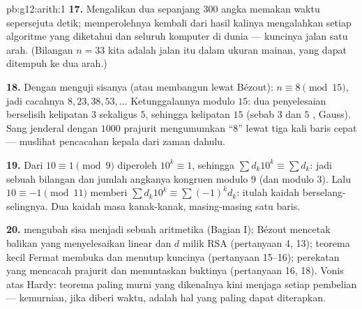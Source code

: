 \begin{solution}{pb:g12:arith:1}
\textbf{17.} Mengalikan dua  sepanjang $300$ angka memakan waktu
sepersejuta detik; memperolehnya kembali dari hasil kalinya mengalahkan setiap
algoritme yang diketahui dan seluruh komputer di dunia --- kuncinya
jalan satu arah. (Bilangan $n = 33$ kita adalah jalan itu dalam ukuran mainan,
yang dapat ditempuh ke dua arah.)

\textbf{18.} Dengan menguji sisanya (atau membangun lewat Bézout):
$n \equiv 8 \pmod{15}$, jadi cacahnya $8, 23, 38, 53, \dots$
Ketunggalannya modulo $15$: dua penyelesaian berselisih kelipatan
$3$ sekaligus $5$, sehingga kelipatan $15$ (sebab $3$ dan $5$ , Gauss).
Sang jenderal dengan $1000$ prajurit mengumumkan ``$8$'' lewat tiga
kali baris cepat --- muslihat pencacahan kepala dari zaman dahulu.

\textbf{19.} Dari $10 \equiv 1 \pmod 9$ diperoleh $10^k \equiv 1$, sehingga
$\sum d_k 10^k \equiv \sum d_k$: jadi sebuah bilangan dan jumlah angkanya
kongruen modulo $9$ (dan modulo $3$). Lalu
$10 \equiv -1 \pmod{11}$ memberi
$\sum d_k 10^k \equiv \sum (-1)^k d_k$: itulah kaidah berselang-selingnya.
Dua kaidah masa kanak-kanak, masing-masing satu baris.

\textbf{20.}  mengubah sisa menjadi sebuah aritmetika
(Bagian I); Bézout mencetak balikan yang menyelesaikan 
linear dan $d$ milik RSA (pertanyaan 4, 13); teorema kecil
Fermat membuka dan menutup kuncinya (pertanyaan 15--16); perekatan
 yang  mencacah prajurit dan menuntaskan buktinya
(pertanyaan 16, 18). Vonis atas Hardy: teorema paling murni yang
dikenalnya kini menjaga setiap pembelian --- kemurnian, jika diberi waktu,
adalah hal yang paling dapat diterapkan.

\end{solution}
